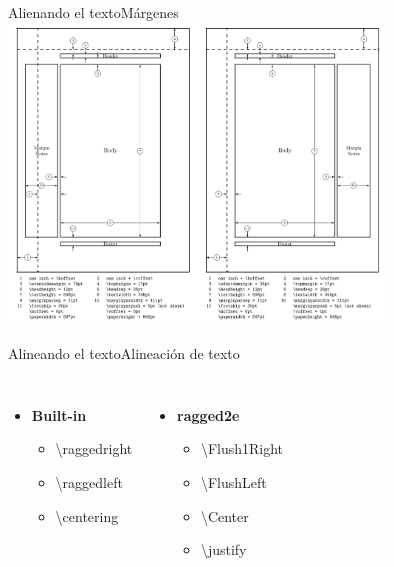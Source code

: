 \begin{frame}{Alienando el texto}{Márgenes}
    \centering
    \includegraphics[width=0.75\textwidth]{images/layout.png}
\end{frame}

\begin{frame}{Alineando el texto}{Alineación de texto}
    \begin{columns}
            \begin{itemize}
                \item \textbf{Built-in}
                \begin{itemize}
                    \item \textbackslash raggedright
                    \item \textbackslash raggedleft
                    \item \textbackslash centering
                \end{itemize}
            \end{itemize}

        \pause
        
            \begin{itemize}
                \item \textbf{ragged2e}
                \begin{itemize}
                    \item \textbackslash Flush1Right
                    \item \textbackslash FlushLeft
                    \item \textbackslash Center
                    \item \textbackslash justify
                \end{itemize}
            \end{itemize}
    \end{columns}
\end{frame}